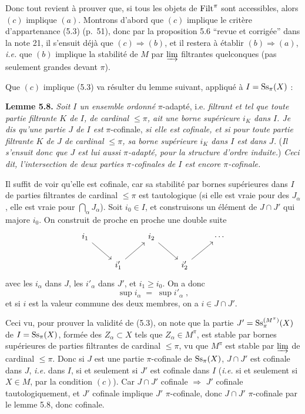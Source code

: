 Donc tout revient à prouver que, si tous les objets de $\mathrm{Filt}^\pi$ sont accessibles, alors $(c)$ implique $(a)$. Montrons d'abord que $(c)$ implique le critère d'appartenance (5.3) (p.~51), donc par la proposition 5.6 “revue et corrigée” dans la note 21, il s'ensuit déjà que $(c) \Longrightarrow (b)$, et il restera à établir $(b) \Longrightarrow (a)$, \textit{i.e.} que $(b)$ implique la stabilité de $M$ par $\varinjlim$ filtrantes quelconques (pas seulement grandes devant $\pi$).

Que $(c)$ implique (5.3) va résulter du lemme suivant, appliqué à $I = \mathrm{Ss}_\pi(X)$ :

\textbf{Lemme 5.8.} \textit{Soit $I$ un ensemble ordonné} $\pi$-adapté, i.e. \textit{filtrant et tel que toute partie filtrante $K$ de $I$, de cardinal $\leq \pi$, ait une borne supérieure $i_K$ dans $I$. Je dis qu'une partie $J$ de $I$ est} $\pi$-cofinale, \textit{si elle est cofinale, et si pour toute partie filtrante $K$ de $J$ de cardinal $\leq \pi$, sa borne supérieure $i_K$ dans $I$ est}
\textit{dans $J$.} (\textit{Il s'ensuit donc que $J$ est lui aussi $\pi$-adapté, pour la structure d'ordre induite.}) \textit{Ceci dit, l'intersection de deux parties $\pi$-cofinales de $I$ est encore $\pi$-cofinale.}

Il suffit de voir qu'elle est cofinale, car sa stabilité par bornes supérieures dans $I$ de parties filtrantes de cardinal $\leq \pi$ est tautologique (si elle est vraie pour des $J_\alpha$, elle est vraie pour $\bigcap_\alpha J_\alpha$). Soit $i_0 \in I$, et construisons un élément de $J \cap J'$ qui majore $i_0$. On construit de proche en proche une double suite
\[
\begin{tikzcd}
i_1 \arrow[dr] & & i_2 \arrow[dr] & & \cdots \\
& i'_1 \arrow[ur] & & i'_2 \arrow[ur] &
\end{tikzcd}
\]
avec les $i_\alpha$ dans $J$, les $i'_\alpha$ dans $J'$, et $i_1 \geq i_0$. On a donc
\[
\sup i_\alpha \;=\; \sup i'_\alpha \;,
\]
et si $i$ est la valeur commune des deux membres, on a $i \in J \cap J'$.

Ceci vu, pour prouver la validité de (5.3), on note que la partie $J' = \mathrm{Ss}_\pi^{(M^\pi)}(X)$ de $I = \mathrm{Ss}_\pi(X)$, formée des $Z_\alpha \subset X$ tels que $Z_\alpha \in M^\pi$, est stable par bornes supérieures de parties filtrantes de cardinal $\leq \pi$, vu que $M^\pi$ est stable
par $\varinjlim$ de cardinal $\leq \pi$. Donc si $J$ est une partie $\pi$-cofinale de $\mathrm{Ss}_\pi(X)$, $J \cap J'$ est cofinale dans $J$, \textit{i.e.} dans $I$, si et seulement si $J'$ est cofinale dans $I$ (\textit{i.e.} si et seulement si $X \in M$, par la condition $(c)$). Car $J \cap J'$ cofinale $\Longrightarrow$ $J'$ cofinale tautologiquement, et $J'$ cofinale implique $J'$ $\pi$-cofinale, donc $J \cap J'$ $\pi$-cofinale par le lemme 5.8, donc cofinale.

